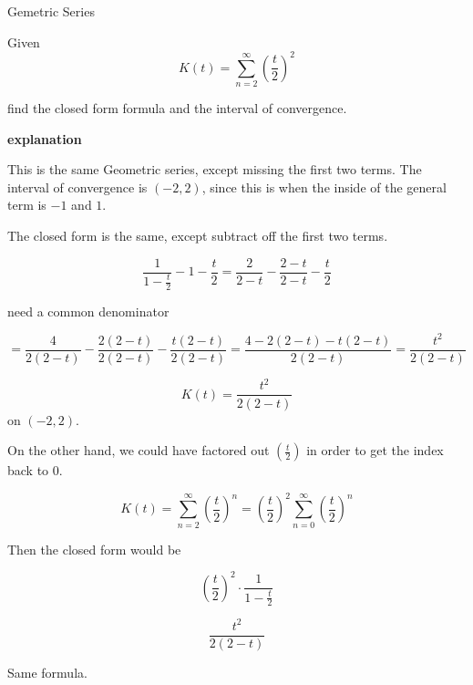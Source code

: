 \documentclass{ximera}
\begin{document}
\begin{example} Gemetric Series


Given 
\[    K(t) =   \sum_{n=2}^{\infty}  \left( \frac{t}{2} \right)^2    \]

find the closed form formula and the interval of convergence.




\textbf{\textcolor{purple!50!blue!90!black}{explanation}}


This is the same Geometric series, except missing the first two terms.  The interval of convergence is $(-2, 2)$, since this is when the inside of the general term is $-1$ and $1$.


The closed form is the same, except subtract off the first two terms.

\[  \frac{1}{1 - \frac{t}{2}}  - 1 - \frac{t}{2}    =     \frac{2}{2-t}  - \frac{2-t}{2-t} - \frac{t}{2}     \]


need a common denominator


\[=     \frac{4}{2(2-t)}  - \frac{2(2-t)}{2(2-t)} - \frac{t(2-t)}{2(2-t)} = \frac{4-2(2-t)-t(2-t)}{2(2-t)}  = \frac{t^2}{2(2-t)}   \]





\[    K(t) =   \frac{t^2}{2(2-t)}    \] on $(-2, 2)$.




\end{example}




On the other hand, we could have factored out $\left( \frac{t}{2} \right)$ in order to get the index back to $0$.


\[    K(t) =   \sum_{n=2}^{\infty}  \left( \frac{t}{2} \right)^n    =  \left( \frac{t}{2} \right)^2 \sum_{n=0}^{\infty}  \left( \frac{t}{2} \right)^n   \]


Then the closed form would be


\[    \left( \frac{t}{2} \right)^2  \cdot \frac{1}{1 - \frac{t}{2}}            \]



\[     \frac{t^2}{2(2 - t)}            \]



Same formula.
\end{document}
